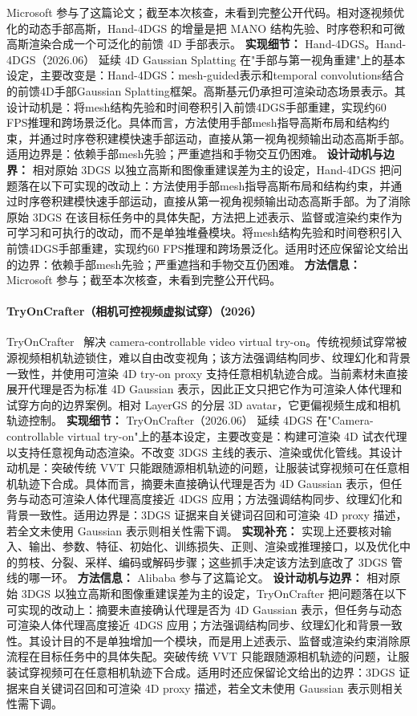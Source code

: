 Microsoft 参与了这篇论文；截至本次核查，未看到完整公开代码。相对逐视频优化的动态手部高斯，Hand-4DGS 的增量是把 MANO 结构先验、时序卷积和可微高斯渲染合成一个可泛化的前馈 4D 手部表示。
\textbf{实现细节：} Hand-4DGS。Hand-4DGS（2026.06） 延续 4D Gaussian Splatting 在"手部与第一视角重建"上的基本设定，主要改变是：Hand-4DGS：mesh-guided表示和temporal convolutions结合的前馈4D手部Gaussian Splatting框架。高斯基元仍承担可渲染动态场景表示。其设计动机是：将mesh结构先验和时间卷积引入前馈4DGS手部重建，实现约60 FPS推理和跨场景泛化。具体而言，方法使用手部mesh指导高斯布局和结构约束，并通过时序卷积建模快速手部运动，直接从第一视角视频输出动态高斯手部。适用边界是：依赖手部mesh先验；严重遮挡和手物交互仍困难。
\textbf{设计动机与边界：} 相对原始 3DGS 以独立高斯和图像重建误差为主的设定，Hand-4DGS 把问题落在以下可实现的改动上：方法使用手部mesh指导高斯布局和结构约束，并通过时序卷积建模快速手部运动，直接从第一视角视频输出动态高斯手部。为了消除原始 3DGS 在该目标任务中的具体失配，方法把上述表示、监督或渲染约束作为可学习和可执行的改动，而不是单独堆叠模块。将mesh结构先验和时间卷积引入前馈4DGS手部重建，实现约60 FPS推理和跨场景泛化。适用时还应保留论文给出的边界：依赖手部mesh先验；严重遮挡和手物交互仍困难。
\textbf{方法信息：} Microsoft 参与；截至本次核查，未看到完整公开代码。



\paragraph{TryOnCrafter（相机可控视频虚拟试穿）（2026）}
TryOnCrafter~\cite{2606_26092} 解决 camera-controllable video virtual try-on。传统视频试穿常被源视频相机轨迹锁住，难以自由改变视角；该方法强调结构同步、纹理幻化和背景一致性，并使用可渲染 4D try-on proxy 支持任意相机轨迹合成。当前素材未直接展开代理是否为标准 4D Gaussian 表示，因此正文只把它作为可渲染人体代理和试穿方向的边界案例。相对 LayerGS 的分层 3D avatar，它更偏视频生成和相机轨迹控制。
\textbf{实现细节：} TryOnCrafter（2026.06） 延续 4DGS 在"Camera-controllable virtual try-on"上的基本设定，主要改变是：构建可渲染 4D 试衣代理以支持任意视角动态渲染。不改变 3DGS 主线的表示、渲染或优化管线。其设计动机是：突破传统 VVT 只能跟随源相机轨迹的问题，让服装试穿视频可在任意相机轨迹下合成。具体而言，摘要未直接确认代理是否为 4D Gaussian 表示，但任务与动态可渲染人体代理高度接近 4DGS 应用；方法强调结构同步、纹理幻化和背景一致性。适用边界是：3DGS 证据来自关键词召回和可渲染 4D proxy 描述，若全文未使用 Gaussian 表示则相关性需下调。
\textbf{实现补充：} 实现上还要核对输入、输出、参数、特征、初始化、训练损失、正则、渲染或推理接口，以及优化中的剪枝、分裂、采样、编码或解码步骤；这些抓手决定该方法到底改了 3DGS 管线的哪一环。
\textbf{方法信息：} Alibaba 参与了这篇论文。
\textbf{设计动机与边界：} 相对原始 3DGS 以独立高斯和图像重建误差为主的设定，TryOnCrafter 把问题落在以下可实现的改动上：摘要未直接确认代理是否为 4D Gaussian 表示，但任务与动态可渲染人体代理高度接近 4DGS 应用；方法强调结构同步、纹理幻化和背景一致性。其设计目的不是单独增加一个模块，而是用上述表示、监督或渲染约束消除原流程在目标任务中的具体失配。突破传统 VVT 只能跟随源相机轨迹的问题，让服装试穿视频可在任意相机轨迹下合成。适用时还应保留论文给出的边界：3DGS 证据来自关键词召回和可渲染 4D proxy 描述，若全文未使用 Gaussian 表示则相关性需下调。
